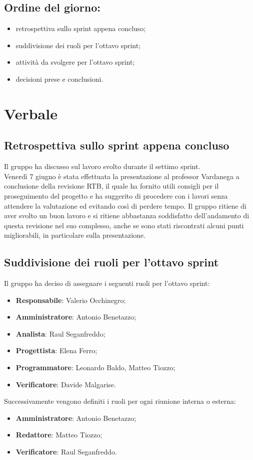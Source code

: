 \documentclass[italian,12pt]{article}
\begin{document}
\subsection*{Ordine del giorno:}
\begin{itemize}
	\item retrospettiva sullo sprint appena concluso;
	\item suddivisione dei ruoli per l'ottavo sprint;
	\item attività da svolgere per l'ottavo sprint;
	\item decisioni prese e conclusioni.
\end{itemize}

\newpage

\section{Verbale}

\subsection{Retrospettiva sullo sprint appena concluso}
Il gruppo ha discusso sul lavoro svolto durante il settimo sprint. \\
Venerdì 7 giugno è stata effettuata la presentazione al professor Vardanega a conclusione della revisione RTB, il quale ha fornito utili consigli per il proseguimento del progetto e ha suggerito di procedere con i lavori senza attendere la valutazione ed evitando così di perdere tempo. Il gruppo ritiene di aver svolto un buon lavoro e si ritiene abbastanza soddisfatto dell'andamento di questa revisione nel suo complesso, anche se sono stati riscontrati alcuni punti migliorabili, in particolare sulla presentazione.

\subsection{Suddivisione dei ruoli per l'ottavo sprint}
Il gruppo ha deciso di assegnare i seguenti ruoli per l'ottavo sprint:
\begin{itemize}
	\item \textbf{Responsabile}: Valerio Occhinegro;
	\item \textbf{Amministratore}: Antonio Benetazzo;
	\item \textbf{Analista}: Raul Seganfreddo;
	\item \textbf{Progettista}: Elena Ferro;
	\item \textbf{Programmatore}: Leonardo Baldo, Matteo Tiozzo;
	\item \textbf{Verificatore}: Davide Malgarise.
\end{itemize}
Successivamente vengono definiti i ruoli per ogni riunione interna o esterna:
\begin{itemize}
	\item \textbf{Amministratore}: Antonio Benetazzo;
	\item \textbf{Redattore}: Matteo Tiozzo;
	\item \textbf{Verificatore}: Raul Seganfreddo.
\end{itemize}
\end{document}
